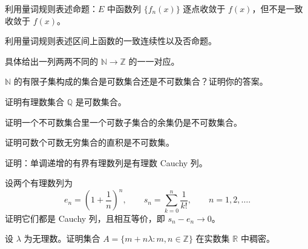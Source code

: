 \noindent\begin{minipage}{\textwidth}
利用量词规则表述命题：$E$ 中函数列 $\{f_n(x)\}$ 逐点收敛于 $f(x)$，但不是一致收敛于 $f(x)$。
\end{minipage}\par\vfill
\noindent\begin{minipage}{\textwidth}
利用量词规则表述区间上函数的一致连续性以及否命题。
\end{minipage}\par\vfill
\noindent\begin{minipage}{\textwidth}
具体给出一列两两不同的 $\mathbb N\to\mathbb Z$ 的一一对应。
\end{minipage}\par\vfill
\newpage
\noindent\begin{minipage}{\textwidth}
$\mathbb N$ 的有限子集构成的集合是可数集合还是不可数集合？证明你的答案。
\end{minipage}\par\vfill
\noindent\begin{minipage}{\textwidth}
证明有理数集合 $\mathbb Q$ 是可数集合。
\end{minipage}\par\vfill
\noindent\begin{minipage}{\textwidth}
证明一个不可数集合里一个可数子集合的余集仍是不可数集合。
\end{minipage}\par\vfill
\noindent\begin{minipage}{\textwidth}
证明可数个可数无穷集合的直积是不可数集。
\end{minipage}\par\vfill
\newpage
\noindent\begin{minipage}{\textwidth}
证明：单调递增的有界有理数列是有理数 Cauchy 列。
\end{minipage}\par\vfill
\noindent\begin{minipage}{\textwidth}
设两个有理数列为\[e_n=\left(1+\frac1n\right)^n,\qquad s_n=\sum_{k=0}^{n}\frac1{k!},\qquad n=1,2,\ldots.\]证明它们都是 Cauchy 列，且相互等价，即 $s_n-e_n\to0$。
\end{minipage}\par\vfill
\noindent\begin{minipage}{\textwidth}
设 $\lambda$ 为无理数。证明集合 $A=\{m+n\lambda:m,n\in\mathbb Z\}$ 在实数集 $\mathbb R$ 中稠密。
\end{minipage}\par\vfill
